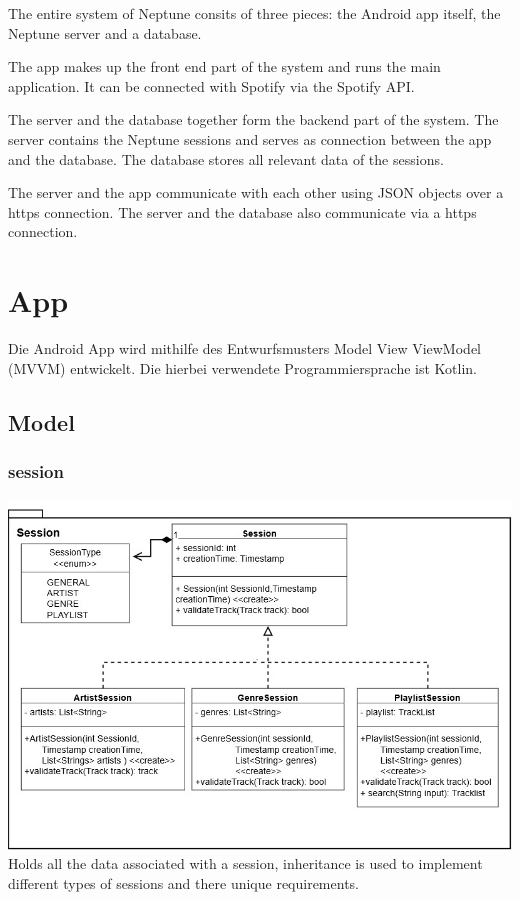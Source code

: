 \documentclass[oneside, nenglish]{sdqtechreport}
\begin{document}
The entire system of Neptune consits of three pieces: the Android app itself, the Neptune server and a database.

The app makes up the front end part of the system and runs the main application. It can be connected with Spotify via the Spotify API.

The server and the database together form the backend part of the system. The server contains the Neptune sessions and serves as connection between the app and the database. The database stores all relevant data of the sessions.

The server and the app communicate with each other using JSON objects over a https connection. The server and the database also communicate via a https connection.

\chapter{App}
\label{chap:App}

Die Android App wird mithilfe des Entwurfsmusters Model View ViewModel (MVVM) entwickelt. Die hierbei verwendete Programmiersprache ist Kotlin.

\section{Model}
\label{sec:App:Model}

\subsection{session}
\label{sec:App:Model:SessionPacket}
\includegraphics[width = 16cm]{LATEX/Entwurf/Graphics/SessionPacket(1).jpg}
Holds all the data associated with a session, inheritance is used to implement different types of sessions and there unique requirements.
\end{document}
